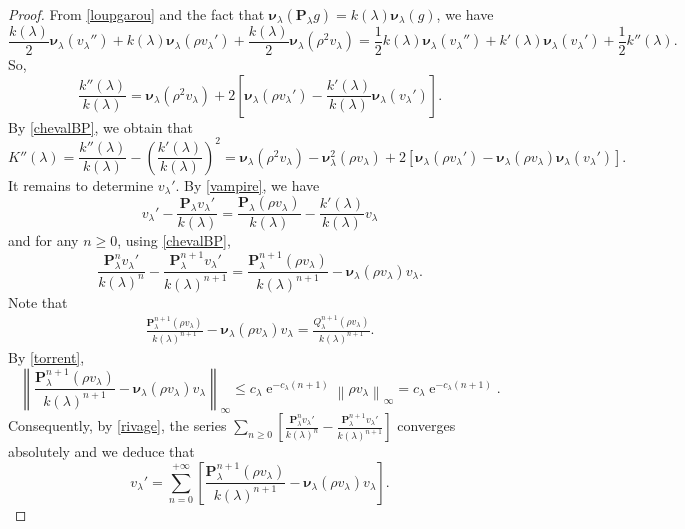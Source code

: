 \documentclass[12pt]{amsart}
\theoremstyle{definition}
\numberwithin{equation}{section}
\newcommand*{\norm}[1]{\left\lVert#1\right\rVert}
\def\bs#1{\boldsymbol{#1}}
\def\bf#1{\mathbf{#1}}
\def\geq{\geqslant}
\def\leq{\leqslant}
\renewcommand\ll{\lambda}
\DeclareMathOperator{\e}{e}
\begin{document}
\begin{proof}
From \eqref{loupgarou} and the fact that $\bs \nu_{\ll} \left( \bf P_{\ll}g \right) = k(\ll) \bs \nu_{\ll} (g)$, we have
\[
\frac{k(\ll)}{2} \bs \nu_{\ll} \left( v_{\ll}'' \right) + k(\ll) \bs \nu_{\ll} \left( \rho v_{\ll}' \right) + \frac{k(\ll)}{2} \bs \nu_{\ll} \left( \rho^2 v_{\ll} \right) = \frac{1}{2} k(\ll) \bs \nu_{\ll} \left( v_{\ll}'' \right) + k'(\ll) \bs \nu_{\ll} \left( v_{\ll}' \right) + \frac{1}{2} k''(\ll).
\]
So,
\[
\frac{k''(\ll)}{k(\ll)} = \bs \nu_{\ll} \left( \rho^2 v_{\ll} \right) + 2 \left[ \bs \nu_{\ll} \left( \rho v_{\ll}' \right) - \frac{k'(\ll)}{k(\ll)}\bs \nu_{\ll} \left( v_{\ll}' \right) \right].
\]
By \eqref{chevalBP}, we obtain that
\begin{equation}
	\label{orient}
	K''(\ll) = \frac{k''(\ll)}{k(\ll)} - \left( \frac{k'(\ll)}{k(\ll)} \right)^2 = \bs \nu_{\ll} \left( \rho^2 v_{\ll} \right) - \bs \nu_{\ll}^2 \left( \rho v_{\ll} \right) + 2 \left[ \bs \nu_{\ll} \left( \rho v_{\ll}' \right) - \bs \nu_{\ll} \left( \rho v_{\ll} \right) \bs \nu_{\ll} \left( v_{\ll}' \right) \right].
\end{equation}
It remains to determine $v_{\ll}'$. By \eqref{vampire}, we have
\[
v_{\ll}' -\frac{\bf P_{\ll} v_{\ll}'}{k(\ll)} = \frac{\bf P_{\ll} \left( \rho v_{\ll} \right)}{k(\ll)} - \frac{k'(\ll)}{k(\ll)} v_{\ll}
\]
and for any $n \geq 0$, using \eqref{chevalBP},
\begin{equation}
	\label{rivage}
	\frac{\bf P_{\ll}^n v_{\ll}'}{k(\ll)^n} - \frac{\bf P_{\ll}^{n+1} v_{\ll}'}{k(\ll)^{n+1}} = \frac{\bf P_{\ll}^{n+1} \left( \rho v_{\ll} \right)}{k(\ll)^{n+1}} - \bs \nu_{\ll} \left( \rho v_{\ll} \right) v_{\ll}.
\end{equation}
Note that
\begin{align*}
	\frac{\bf P_{\ll}^{n+1} \left( \rho v_{\ll} \right)}{k(\ll)^{n+1}} - \bs \nu_{\ll} \left( \rho v_{\ll} \right) v_{\ll} = \frac{Q_{\ll}^{n+1}\left( \rho v_{\ll} \right)}{k(\ll)^{n+1}}.
\end{align*}
By \eqref{torrent},
\[
\norm{\frac{\bf P_{\ll}^{n+1} \left( \rho v_{\ll} \right)}{k(\ll)^{n+1}} - \bs \nu_{\ll} \left( \rho v_{\ll} \right) v_{\ll}}_{\infty} \leq c_{\ll}\e^{-c_{\ll}(n+1)} \norm{\rho v_{\ll}}_{\infty} = c_{\ll}\e^{-c_{\ll}(n+1)}.
\]
Consequently, by \eqref{rivage}, the series $\sum_{n\geq 0} \left[ \frac{\bf P_{\ll}^n v_{\ll}'}{k(\ll)^n} - \frac{\bf P_{\ll}^{n+1} v_{\ll}'}{k(\ll)^{n+1}} \right]$ converges absolutely and we deduce that
\[
v_{\ll}' = \sum_{n=0}^{+\infty} \left[ \frac{\bf P_{\ll}^{n+1} \left( \rho v_{\ll} \right)}{k(\ll)^{n+1}} - \bs \nu_{\ll} \left( \rho v_{\ll} \right) v_{\ll} \right].
\]
\end{proof}
\end{document}
